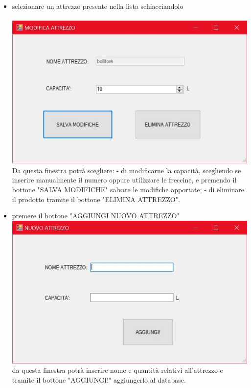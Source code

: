 \documentclass[a4paper, titlepage]{article}
\begin{document}
\begin{itemize}
    \item selezionare un attrezzo presente nella lista schiacciandolo\\\\
    \includegraphics[scale=0.30]{Immagini/form/Form ModificaAtt.jpg}
    \\Da questa finestra potrà scegliere:
        \subitem - di modificarne la capacità, scegliendo se inserire manualmente il numero oppure utilizzare le freccine, e premendo il bottone "SALVA MODIFICHE" salvare le modifiche apportate;
        \subitem - di eliminare il prodotto tramite il bottone "ELIMINA ATTREZZO".
    \item premere il bottone "AGGIUNGI NUOVO ATTREZZO"\\
    \includegraphics[scale=0.30]{Immagini/form/Form AggiuntaAtt.jpg}
    \\da questa finestra potrà inserire nome e quantità relativi all'attrezzo e tramite il bottone "AGGIUNGI!" aggiungerlo al database.
\end{itemize}
\end{document}
